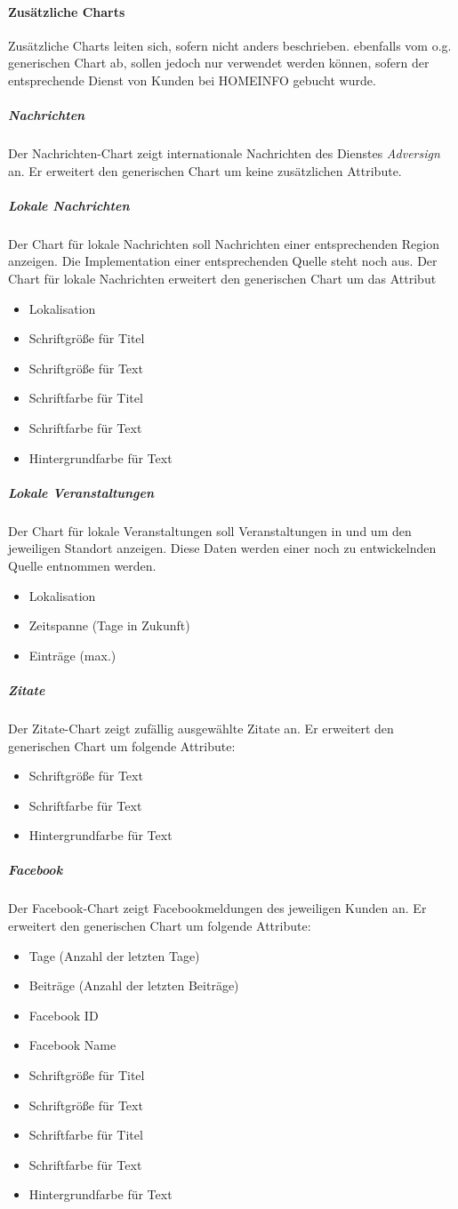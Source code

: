 \documentclass[a4paper]{article}
\begin{document}
	\paragraph{Zusätzliche Charts}
	Zusätzliche Charts leiten sich, sofern nicht anders beschrieben. ebenfalls vom o.g. generischen Chart ab, sollen jedoch nur verwendet werden können, sofern der entsprechende Dienst von Kunden bei HOMEINFO gebucht wurde.
	\subparagraph{Nachrichten}
	Der Nachrichten-Chart zeigt internationale Nachrichten des Dienstes \emph{Adversign} an. Er erweitert den generischen Chart um keine zusätzlichen Attribute.
	\subparagraph{Lokale Nachrichten}
	Der Chart für lokale Nachrichten soll Nachrichten einer entsprechenden Region anzeigen. Die Implementation einer entsprechenden Quelle steht noch aus. Der Chart für lokale Nachrichten erweitert den generischen Chart um das Attribut
	\begin{itemize}
	\item Lokalisation
	\item Schriftgröße für Titel
	\item Schriftgröße für Text
	\item Schriftfarbe für Titel
	\item Schriftfarbe für Text
	\item Hintergrundfarbe für Text
	\end{itemize}
	\pagebreak
	\subparagraph{Lokale Veranstaltungen}
	Der Chart für lokale Veranstaltungen soll Veranstaltungen in und um den jeweiligen Standort anzeigen. Diese Daten werden einer noch zu entwickelnden Quelle entnommen werden.
	\begin{itemize}
	\item Lokalisation
	\item Zeitspanne (Tage in Zukunft)
	\item Einträge (max.)
	\end{itemize}
	\subparagraph{Zitate}
	Der Zitate-Chart zeigt zufällig ausgewählte Zitate an. Er erweitert den generischen Chart um folgende Attribute:
	\begin{itemize}
	\item Schriftgröße für Text
	\item Schriftfarbe für Text
	\item Hintergrundfarbe für Text
	\end{itemize}
	\subparagraph{Facebook}
	Der Facebook-Chart zeigt Facebookmeldungen des jeweiligen Kunden an.
	Er erweitert den generischen Chart um folgende Attribute:
	\begin{itemize}
	\item Tage (Anzahl der letzten Tage)
	\item Beiträge (Anzahl der letzten Beiträge)
	\item Facebook ID
	\item Facebook Name
	\item Schriftgröße für Titel
	\item Schriftgröße für Text
	\item Schriftfarbe für Titel
	\item Schriftfarbe für Text
	\item Hintergrundfarbe für Text
	\end{itemize}
\end{document}
